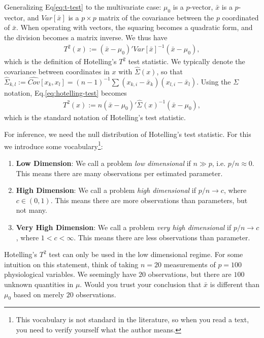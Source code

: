 \documentclass[]{book}
\providecommand{\tightlist}{%
  \setlength{\itemsep}{0pt}\setlength{\parskip}{0pt}}
\theoremstyle{definition}
\theoremstyle{definition}
\theoremstyle{definition}
\theoremstyle{remark}
\begin{document}
Generalizing Eq\eqref{eq:t-test} to the multivariate case:
\(\mu_0\) is a \(p\)-vector, \(\bar x\) is a \(p\)-vector, and \(Var[\bar x]\) is a \(p \times p\) matrix of the covariance between the \(p\) coordinated of \(\bar x\).
When operating with vectors, the squaring becomes a quadratic form, and the division becomes a matrix inverse.
We thus have
\begin{align}
  T^2(x):= (\bar{x}-\mu_0)' Var[\bar{x}]^{-1} (\bar{x}-\mu_0),
  \label{eq:hotelling-test}
\end{align}
which is the definition of Hotelling's \(T^2\) test statistic.
We typically denote the covariance between coordinates in \(x\) with \(\hat \Sigma(x)\), so that
\(\widehat \Sigma_{k,l}:=\widehat {Cov}[x_k,x_l]=(n-1)^{-1} \sum (x_{k,i}-\bar x_k)(x_{l,i}-\bar x_l)\).
Using the \(\Sigma\) notation, Eq.\eqref{eq:hotelling-test} becomes
\begin{align}
  T^2(x):= n (\bar{x}-\mu_0)' \hat \Sigma(x)^{-1} (\bar{x}-\mu_0),
\end{align}
which is the standard notation of Hotelling's test statistic.

For inference, we need the null distribution of Hotelling's test statistic. For this we introduce some vocabulary\footnote{This vocabulary is not standard in the literature, so when you read a text, you need to verify yourself what the author means.}:

\begin{enumerate}
\def\labelenumi{\arabic{enumi}.}
\tightlist
\item
  \textbf{Low Dimension}:
  We call a problem \emph{low dimensional} if \(n \gg p\), i.e. \(p/n \approx 0\).
  This means there are many observations per estimated parameter.
\item
  \textbf{High Dimension}:
  We call a problem \emph{high dimensional} if \(p/n \to c\), where \(c\in (0,1)\).
  This means there are more observations than parameters, but not many.
\item
  \textbf{Very High Dimension}:
  We call a problem \emph{very high dimensional} if \(p/n \to c\), where \(1<c<\infty\).
  This means there are less observations than parameter.
\end{enumerate}

Hotelling's \(T^2\) test can only be used in the low dimensional regime.
For some intuition on this statement, think of taking \(n=20\) measurements of \(p=100\) physiological variables.
We seemingly have \(20\) observations, but there are \(100\) unknown quantities in \(\mu\).
Would you trust your conclusion that \(\bar x\) is different than \(\mu_0\) based on merely \(20\) observations.
\end{document}
